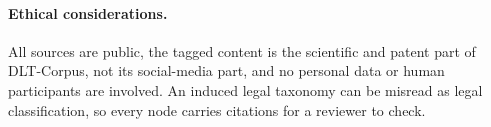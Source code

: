 \paragraph{Ethical considerations.}
All sources are public, the tagged content is the scientific and patent
part of DLT-Corpus, not its social-media part, and no personal data or human
participants are involved. An induced legal
taxonomy can be misread as legal classification, so every node carries
citations for a reviewer to check.
